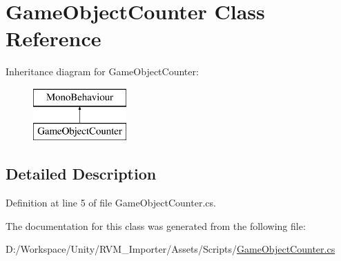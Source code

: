 \hypertarget{class_game_object_counter}{}\section{Game\+Object\+Counter Class Reference}
\label{class_game_object_counter}
Inheritance diagram for Game\+Object\+Counter\+:\begin{figure}[H]
\begin{center}
\leavevmode
\includegraphics[height=2.000000cm]{class_game_object_counter}
\end{center}
\end{figure}


\subsection{Detailed Description}


Definition at line 5 of file Game\+Object\+Counter.\+cs.



The documentation for this class was generated from the following file\+:\begin{DoxyCompactItemize}
\item 
D\+:/\+Workspace/\+Unity/\+R\+V\+M\+\_\+\+Importer/\+Assets/\+Scripts/\mbox{\hyperlink{_game_object_counter_8cs}{Game\+Object\+Counter.\+cs}}\end{DoxyCompactItemize}
